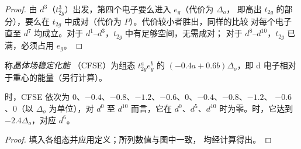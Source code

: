 \begin{proof}
由 $d^3$（$t_{2g}^3$）出发，第四个电子要么进入 $e_g$（代价为 $\Delta_o$，
即高出 $t_{2g}$ 的部分），要么在 $t_{2g}$ 中成对（代价为 $P$）。代价较小者胜出，同样的比较
对每个电子直至 $d^7$ 均成立。对于 $d^1$--$d^3$，$t_{2g}$ 中有足够空间，无需成对；
对于 $d^8$--$d^{10}$，$t_{2g}$ 已满，必须占用 $e_g$。
\end{proof}

\begin{definition}[晶体场稳定化能]\label{def:b2:ligand-field:cfse}
称\emph{晶体场稳定化能}
（CFSE）为组态 $t_{2g}^ae_g^b$ 的 $(-0.4a + 0.6b)\Delta_o$，即
d 电子相对于重心的能量（另行计算）。
\end{definition}

\begin{proposition}[沿系列的晶体场稳定化能]\label{prop:b2:ligand-field:cfse}
时，CFSE 依次为 $0$、$-0.4$、$-0.8$、$-1.2$、$-0.6$、$0$、$-0.4$、$-0.8$、$-1.2$、
$-0.6$、$0$（以 $\Delta_o$ 为单位），对 $d^0$ 至 $d^{10}$ 而言，它在 $d^0$、$d^5$、$d^{10}$ 时为零。时，它达到 $-2.4\Delta_o$，对应 $d^6$。
\end{proposition}

\begin{proof}
填入各组态并应用定义；所列数值与图中一致，
均经计算得出。
\end{proof}

